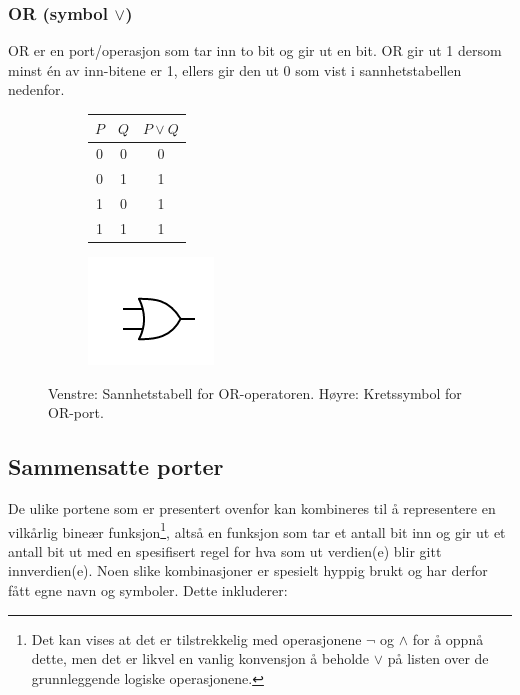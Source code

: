 \subsubsection{OR (symbol $\lor$)}
OR er en port/operasjon som tar inn to bit og gir ut en bit. OR gir ut 1 dersom minst \'en av inn-bitene er 1, ellers gir den ut 0 som vist i sannhetstabellen nedenfor.
\begin{center}
\begin{figure}[h]
\begin{subfigure}{.3\textwidth}
	\begin{tabular}{|c|c|c|}
	\hline
	$P$ & $Q$ & $P \lor Q$ \\
	\hline
	0 & 0 & 0\\
	0 & 1 & 1 \\
	1 & 0 & 1 \\
	1 & 1 & 1 \\
	\hline
	\end{tabular}
\end{subfigure}
\begin{subfigure}{.3\textwidth}
	\includegraphics{./gate_or}
\end{subfigure}
\caption{Venstre: Sannhetstabell for OR-operatoren. Høyre: Kretssymbol for OR-port.}
\end{figure}
\end{center}

\subsection{Sammensatte porter}
De ulike portene som er presentert ovenfor kan kombineres til å representere en vilkårlig bineær funksjon\footnote{Det kan vises at det er tilstrekkelig med operasjonene $\neg$ og $\land$ for å oppnå dette, men det er likvel en vanlig konvensjon å beholde $\lor$ på listen over de grunnleggende logiske operasjonene.}, altså en funksjon som tar et antall bit inn og gir ut et antall bit ut med en spesifisert regel for hva som ut verdien(e) blir gitt innverdien(e). Noen slike kombinasjoner er spesielt hyppig brukt og har derfor fått egne navn og symboler. Dette inkluderer:

